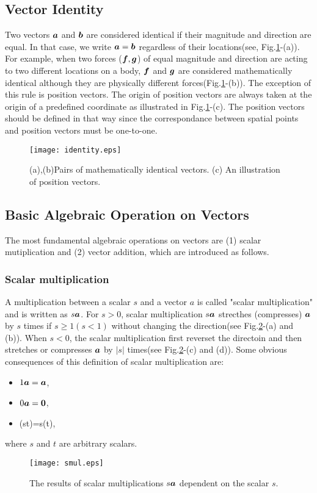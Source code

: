 \documentclass[10pt,a4j]{article}
\begin{document}
\subsection{Vector Identity}
Two vectors $\mbox{\boldmath $a$}$ and $\mbox{\boldmath $b$}$ are considered identical 
if their magnitude and direction are equal.
In that case, we write $\mbox{\boldmath $a$}=\mbox{\boldmath $b$}$ regardless of their locations(see, Fig.\ref{fig:fig1_2}-(a)). 
For example, when two forces ($\mbox{\boldmath $f$}, \mbox{\boldmath $g$}$) of equal magnitude and direction 
are acting to two different locations on a body, 
$\mbox{\boldmath $f$}$ and $\mbox{\boldmath $g$}$ are considered mathematically identical although they 
are physically different forces(Fig.\ref{fig:fig1_2}-(b)).
The exception of this rule is position vectors. 
The origin of position vectors are always taken at 
the origin of a predefined coordinate as illustrated in Fig.\ref{fig:fig1_2}-(c).
The position vectors should be defined in that way since the correspondance between 
spatial points and position vectors must be one-to-one. 
\begin{figure}[h]
	\begin{center}
	\texttt{[image: identity.eps]} 
	\end{center}
	\caption{(a),(b)Pairs of mathematically identical vectors. 
	(c) An illustration of position vectors.} 
	\label{fig:fig1_2}
\end{figure}
\subsection{Basic Algebraic Operation on Vectors}
The most fundamental algebraic operations on vectors are (1) scalar mutiplication 
and (2) vector addition, which are introduced as follows.
\subsubsection{Scalar multiplication}
A multiplication between a scalar $s$ and a vector $a$ is called "scalar multiplication" 
and is written as $s\mbox{\boldmath $a$}$. For $s>0$, scalar multiplication $s\mbox{\boldmath $a$}$ strecthes (compresses) $\mbox{\boldmath $a$}$ 
by $s$ times if $s \geq 1 (s<1)$ without changing the direction(see Fig.\ref{fig:fig1_3}-(a) and (b)).
When $s<0$, the scalar multiplication first reverset the directoin and then stretches or compresses 
$\mbox{\boldmath $a$}$ by $|s|$ times(see Fig.\ref{fig:fig1_3}-(c) and (d)).
Some obvious consequences of this definition of scalar multiplication are:
\begin{itemize}
\item 
	$1\mbox{\boldmath $a$}=\mbox{\boldmath $a$}$,
\item 
	$0\mbox{\boldmath $a$}=\mbox{\boldmath $0$}$,
\item
	(st)=s(t),
\end{itemize}
where $s$ and $t$ are arbitrary scalars. 
\begin{figure}[h]
	\begin{center}
	\texttt{[image: smul.eps]} 
	\end{center}
	\caption{The results of scalar multiplications $s\mbox{\boldmath $a$}$ dependent on the scalar $s$.} 
	\label{fig:fig1_3}
\end{figure}
\end{document}
